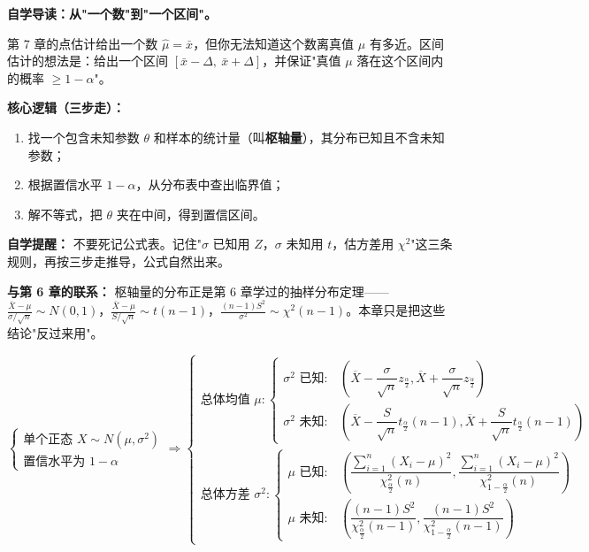﻿\documentclass[lang=cn,11pt]{elegantbook}
\begin{document}
\begin{note}
\textbf{自学导读：从"一个数"到"一个区间"。}

第 7 章的点估计给出一个数 $\hat\mu = \bar{x}$，但你无法知道这个数离真值 $\mu$ 有多近。区间估计的想法是：给出一个区间 $[\bar{x}-\Delta,\ \bar{x}+\Delta]$，并保证"真值 $\mu$ 落在这个区间内的概率 $\geqslant 1-\alpha$"。

\textbf{核心逻辑（三步走）：}
\begin{enumerate}
    \item 找一个包含未知参数 $\theta$ 和样本的统计量（叫\textbf{枢轴量}），其分布已知且不含未知参数；
    \item 根据置信水平 $1-\alpha$，从分布表中查出临界值；
    \item 解不等式，把 $\theta$ 夹在中间，得到置信区间。
\end{enumerate}

\textbf{自学提醒：} 不要死记公式表。记住"$\sigma$ 已知用 $Z$，$\sigma$ 未知用 $t$，估方差用 $\chi^2$"这三条规则，再按三步走推导，公式自然出来。

\textbf{与第 6 章的联系：} 枢轴量的分布正是第 6 章学过的抽样分布定理——$\frac{\bar{X}-\mu}{\sigma/\sqrt{n}}\sim N(0,1)$，$\frac{\bar{X}-\mu}{S/\sqrt{n}}\sim t(n-1)$，$\frac{(n-1)S^2}{\sigma^2}\sim\chi^2(n-1)$。本章只是把这些结论"反过来用"。
\end{note}


{\small
\[
\begin{cases}
\text{单个正态 } X\sim N(\mu,\sigma^2) \\
\text{置信水平为 } 1-\alpha
\end{cases}
\Rightarrow
\begin{cases}
\text{总体均值 } \mu:
\begin{cases}
\sigma^2 \text{ 已知}: & \left( \overline{X} - \dfrac{\sigma}{\sqrt{n}} z_{\frac{\alpha}{2}}, \overline{X} + \dfrac{\sigma}{\sqrt{n}} z_{\frac{\alpha}{2}} \right)\\[4pt]
\sigma^2 \text{ 未知}: & \left( \overline{X} - \dfrac{S}{\sqrt{n}} t_{\frac{\alpha}{2}}(n-1), \overline{X} + \dfrac{S}{\sqrt{n}} t_{\frac{\alpha}{2}}(n-1) \right)
\end{cases}\\[8pt]
\text{总体方差 } \sigma^2:
\begin{cases}
\mu \text{ 已知}: & \left( \dfrac{\sum_{i=1}^n (X_i-\mu)^2}{\chi_{\frac{\alpha}{2}}^2(n)}, \dfrac{\sum_{i=1}^n (X_i-\mu)^2}{\chi_{1-\frac{\alpha}{2}}^2(n)} \right)\\[4pt]
\mu \text{ 未知}: & \left( \dfrac{(n-1)S^2}{\chi_{\frac{\alpha}{2}}^2(n-1)}, \dfrac{(n-1)S^2}{\chi_{1-\frac{\alpha}{2}}^2(n-1)} \right)
\end{cases}
\end{cases}
\]
}
\end{document}

